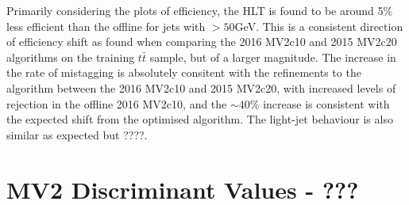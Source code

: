 		Primarily considering the \pt plots of efficiency, the HLT \btag is found to be around 5\% less efficient than the offline \btag for jets with \pt$>50$GeV. This is a consistent direction of efficiency shift as found when comparing the 2016 MV2c10 and 2015 MV2c20 algorithms on the training $t\bar{t}$ sample, but of a larger magnitude. The increase in the rate of \cjet mistagging is absolutely consitent with the refinements to the algorithm between the 2016 MV2c10 and 2015 MV2c20, with increased levels of \cjet rejection in the offline 2016 MV2c10, and the $\sim40$\% increase is consistent with the expected shift from the optimised algorithm. \cite{btagOptimisation} The light-jet behaviour is also similar as expected but ????. 


	\section{MV2 Discriminant Values - ???} 




\endinput
